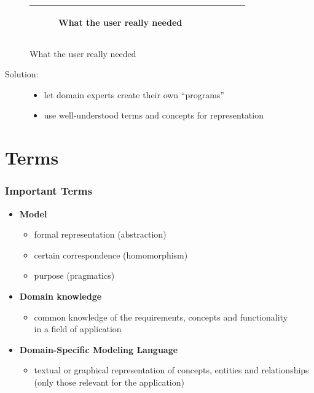 \documentclass[11 pt,t]{beamer}
\begin{document}
\begin{frame}
\begin{figure}[h]
\begin{center}
{\begin{tabular}{|c|c|c|c|c|}
\begin{subfigure}[t]{0.15\textwidth}
\caption*{\tiny \centering What the user really needed}\label{fig:whatneeded}\end{subfigure}\\
\hline
\end{tabular}}
\label{fig:swingexample}
\end{center}
\end{figure}

\begin{description}
  \item [Solution:] 
  \begin{itemize}
     \item let domain experts create their own ``programs''
     \item use well-understood terms and concepts for representation
    \end{itemize}
\end{description}
\end{frame}

\section{Terms}
\begin{frame}
\vspace{.5cm}
  \frametitle{Important Terms}
  \begin{itemize}
    \item \textbf{Model}
      \begin{itemize}
       \item formal representation (abstraction)
       \item certain correspondence (homomorphism)
       \item purpose (pragmatics)
      \end{itemize}
      
    \item \textbf{Domain knowledge}
      \begin{itemize}
       \item common knowledge of the requirements, concepts and functionality 
	    \\in a field of application
      \end{itemize}

    \item \textbf{Domain-Specific Modeling Language}
    \begin{itemize}
       \item textual or graphical representation of concepts, entities and relationships
	      (only those relevant for the application)
      \end{itemize}

  \end{itemize}
\end{frame}
\end{document}
